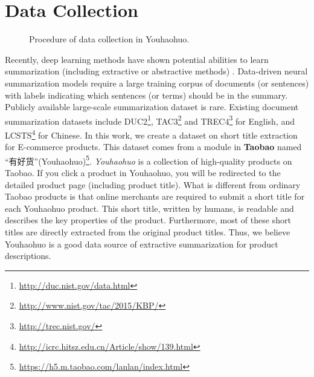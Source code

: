 \section{Data Collection}
\label{sec:data}

\begin{figure*}[h]
	\centering
	\caption{Procedure of data collection in Youhaohuo.}
	\label{fig:youhaohuo_demo}
\end{figure*}

Recently, deep learning methods have shown potential abilities
to learn summarization (including extractive or abstractive methods) \cite{cheng2016neural,narayan2017neural,rush2015neural}.
Data-driven neural summarization models require a large training corpus of
documents (or sentences) with labels indicating which sentences (or terms) should be in the summary.
Publicly available large-scale summarization dataset is rare.
Existing document summarization datasets include
DUC2\footnote{\url{http://duc.nist.gov/data.html}}, 
TAC3\footnote{\url{http://www.nist.gov/tac/2015/KBP/}} and 
TREC4\footnote{\url{http://trec.nist.gov/}} for English,
and LCSTS\footnote{\url{http://icrc.hitsz.edu.cn/Article/show/139.html}} for
Chinese.
In this work, we create a dataset on short title extraction for 
E-commerce products. 
This dataset comes from a module in \textbf{Taobao} named ``有好货''(Youhaohuo)\footnote{\url{https://h5.m.taobao.com/lanlan/index.html}}.
{\em Youhaohuo} is a collection of high-quality 
products on Taobao.  If you click a product in Youhaohuo, you will 
be redirected to the detailed product page (including product title).
What is different from ordinary Taobao products is that online merchants are 
required to submit a short title for each Youhaohuo product.
This short title, written by humans, is readable and describes the 
key properties of the product.
Furthermore, most of these short titles are directly extracted from the 
original product titles. 
Thus, we believe Youhaohuo is a good data source of 
extractive summarization for product descriptions.


